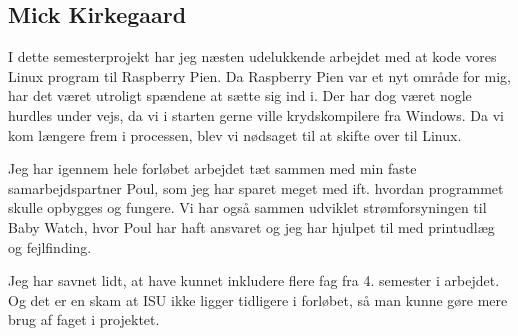\subsection*{Mick Kirkegaard}

I dette semesterprojekt har jeg næsten udelukkende arbejdet med at kode vores Linux program til Raspberry Pien. Da Raspberry Pien var et nyt område for mig, har det været utroligt spændene at sætte sig ind i. Der har dog været nogle hurdles under vejs, da vi i starten gerne ville krydskompilere fra Windows. Da vi kom længere frem i processen, blev vi nødsaget til at skifte over til Linux.

Jeg har igennem hele forløbet arbejdet tæt sammen med min faste samarbejdspartner Poul, som jeg har sparet meget med ift. hvordan programmet skulle opbygges og fungere. Vi har også sammen udviklet strømforsyningen til Baby Watch, hvor Poul har haft ansvaret og jeg har hjulpet til med printudlæg og fejlfinding.

Jeg har savnet lidt, at have kunnet inkludere flere fag fra 4. semester i arbejdet. Og det er en skam at ISU ikke ligger tidligere i forløbet, så man kunne gøre mere brug af faget i projektet. 